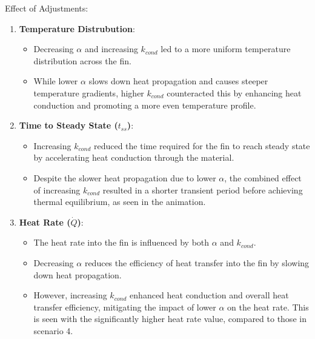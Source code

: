 \documentclass{article}
\begin{document}
Effect of Adjustments:
\begin{enumerate}
    \item \textbf{Temperature Distrubution}:
        \begin{itemize}
            \item Decreasing $\alpha$ and increasing $k_{cond}$ led to a more uniform temperature distribution across the fin.
            \item While lower $\alpha$ slows down heat propagation and causes steeper temperature gradients, higher $k_{cond}$ counteracted this by enhancing heat conduction and promoting a more even temperature profile.
        \end{itemize}
    \item \textbf{Time to Steady State ($t_{ss}$)}:
        \begin{itemize}
            \item Increasing $k_{cond}$ reduced the time required for the fin to reach steady state by accelerating heat conduction through the material.
            \item Despite the slower heat propagation due to lower $\alpha$, the combined effect of increasing $k_{cond}$ resulted in a shorter transient period before achieving thermal equilibrium, as seen in the animation.
        \end{itemize}
    \item \textbf{Heat Rate ($\dot{Q}$)}:
        \begin{itemize}
            \item The heat rate into the fin is influenced by both $\alpha$ and $k_{cond}$.
            \item Decreasing $\alpha$ reduces the efficiency of heat transfer into the fin by slowing down heat propagation.
            \item However, increasing $k_{cond}$ enhanced heat conduction and overall heat transfer efficiency, mitigating the impact of lower $\alpha$ on the heat rate. This is seen with the significantly higher heat rate value, compared to those in scenario 4.
        \end{itemize}
\end{enumerate}
\end{document}
